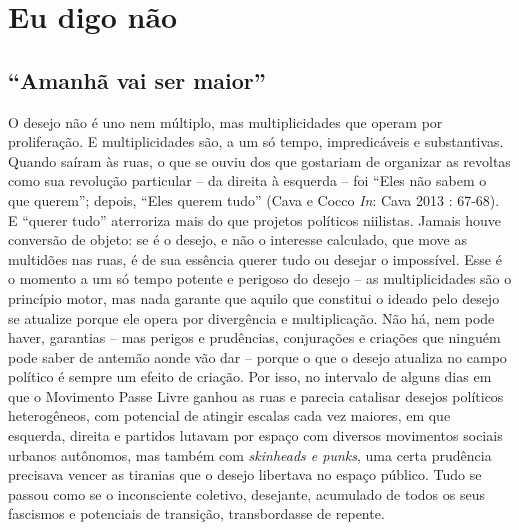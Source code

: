 \section{Eu digo não}

\subsection{``Amanhã vai ser maior''}

O desejo não é uno nem múltiplo, mas
multiplicidades que operam por proliferação. E multiplicidades são, a um
só tempo, impredicáveis e substantivas. Quando saíram às ruas, o que se
ouviu dos que gostariam de organizar as revoltas como sua revolução
particular -- da direita à esquerda -- foi ``Eles não sabem o que
querem''; depois, ``Eles querem tudo'' (Cava e Cocco \emph{In}: Cava
2013 : 67-68). E ``querer tudo'' aterroriza mais do que projetos
políticos niilistas. Jamais houve conversão de objeto: se é o desejo, e
não o interesse calculado, que move as multidões nas ruas, é de sua
essência querer tudo ou desejar o impossível. Esse é o momento a um só
tempo potente e perigoso do desejo -- as multiplicidades são o princípio
motor, mas nada garante que aquilo que constitui o ideado pelo desejo se
atualize porque ele opera por divergência e multiplicação. Não há, nem
pode haver, garantias -- mas perigos e prudências, conjurações e
criações que ninguém pode saber de antemão aonde vão dar -- porque o que
o desejo atualiza no campo político é sempre um efeito de criação. Por
isso, no intervalo de alguns dias em que o Movimento Passe Livre ganhou
as ruas e parecia catalisar desejos políticos heterogêneos, com
potencial de atingir escalas cada vez maiores, em que esquerda, direita
e partidos lutavam por espaço com diversos movimentos sociais urbanos
autônomos, mas também com \emph{skinheads e punks}, uma certa prudência
precisava vencer as tiranias que o desejo libertava no espaço público.
Tudo se passou como se o inconsciente coletivo, desejante, acumulado de
todos os seus fascismos e potenciais de transição, transbordasse de
repente.


